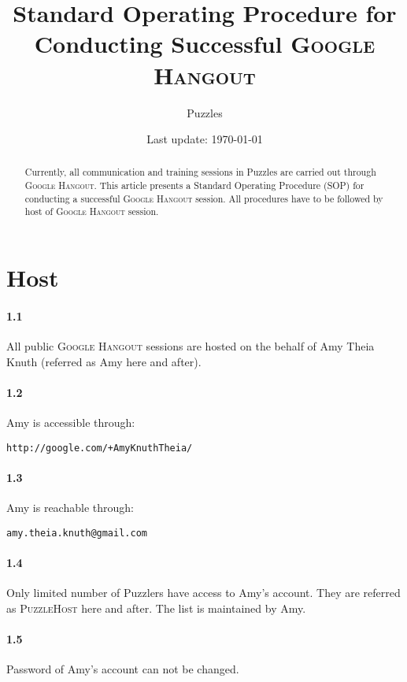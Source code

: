 \documentclass{article}
\title{\textbf{Standard Operating Procedure for Conducting Successful} \textsc{Google Hangout}}
\author{Puzzles}
\date{Last update: \today}
\newcommand{\hangout}{\textsc{Google Hangout}\xspace}
\newcommand{\host}{\textsc{PuzzleHost}\xspace}
\begin{document}
\maketitle

\begin{abstract}
Currently, all communication and training sessions in Puzzles are carried out through \hangout. This article presents a Standard Operating Procedure (SOP) for conducting a successful \hangout session. All procedures have to be followed by host of \hangout session.
\end{abstract}

\tableofcontents

\section{Host}

\paragraph{1.1} All public \hangout sessions are hosted on the behalf of Amy Theia Knuth (referred as Amy here and after).

\paragraph{1.2} Amy is accessible through:
\begin{verbatim}
http://google.com/+AmyKnuthTheia/
\end{verbatim}

\paragraph{1.3} Amy is reachable through:
\begin{verbatim}
amy.theia.knuth@gmail.com
\end{verbatim}

\paragraph{1.4} Only limited number of Puzzlers have access to Amy's account. They are referred as \host here and after. The list is maintained by Amy.

\paragraph{1.5} Password of Amy's account can not be changed.
\end{document}
